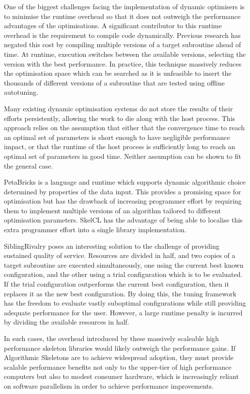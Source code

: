 One of the biggest challenges facing the implementation of dynamic
optimisers is to minimise the runtime overhead so that it does not
outweigh the performance advantages of the optimisations. A
significant contributor to this runtime overhead is the requirement to
compile code dynamically. Previous research has negated this cost by
compiling multiple versions of a target subroutine ahead of time. At
runtime, execution switches between the available versions, selecting
the version with the best performance. In practice, this technique
massively reduces the optimisation space which can be searched as it
is unfeasible to insert the thousands of different versions of a
subroutine that are tested using offline autotuning.

Many existing dynamic optimisation systems do not store the results of
their efforts persistently, allowing the work to die along with the
host process. This approach relies on the assumption that either that
the convergence time to reach an optimal set of parameters is short
enough to have negligible performance impact, or that the runtime of
the host process is sufficiently long to reach an optimal set of
parameters in good time. Neither assumption can be shown to fit the
general case.

PetaBricks is a language and runtime which supports dynamic
algorithmic choice determined by properties of the data input. This
provides a promising space for optimisation but has the drawback of
increasing programmer effort by requiring them to implement multiple
versions of an algorithm tailored to different optimisation
parameters. SkelCL has the advantage of being able to localise this
extra programmer effort into a single library implementation.

SiblingRivalry poses an interesting solution to the challenge of
providing sustained quality of service. Resources are divided in half,
and two copies of a target subroutine are executed simultaneously, one
using the current best known configuration, and the other using a
trial configuration which is to be evaluated. If the trial
configuration outperforms the current best configuration, then it
replaces it as the new best configuration. By doing this, the tuning
framework has the freedom to evaluate vastly suboptimal configurations
while still providing adequate performance for the user. However, a
large runtime penalty is incurred by dividing the available resources
in half.

In such cases, the overhead introduced by these massively scaleable
high performance skeleton libraries would likely outweigh the
performance gains. If Algorithmic Skeletons are to achieve widespread
adoption, they must provide scalable performance benefits not only to
the upper-tier of high performance computers but also to modest
consumer hardware, which is increasingly reliant on software
parallelism in order to achieve performance improvements.

